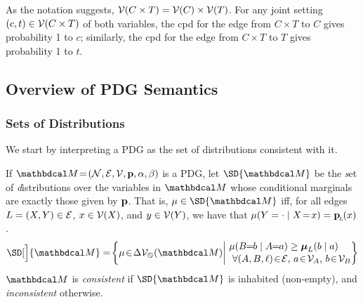 \documentclass{article}
\begin{document}
\begin{constr}
As the notation suggests, $\mathcal V( C \times T) = \mathcal V(C) \times \mathcal V(T)$.
For any joint setting $(c,t) \in \mathcal V(C \times T)$ of both variables, the cpd for
the edge from $C \times T$ to $C$ gives probability 1 to $c$;
similarly, the cpd for the edge from $ C \times T$ to $T$ gives probability 1 to $t$.
\end{constr}


	\subsection{Overview of PDG Semantics}
	\subsubsection{Sets of Distributions}
	We start by interpreting a PDG as the set of distributions consistent with it.  
	\begin{defn} \label{def:set-semantics} 
		If $\dg M\!=\!\pdgvars[]$ is a PDG, let $\SD{\dg M}$ be the \emph{s}et of \emph{d}istributions over the variables in $\dg M$ whose conditional marginals are exactly those given by $\mathbf p$.
		That is, $\mu \in \SD{\dg M}$ iff, for all edges $L = (X,Y) \in \mathcal E$,  $x \in \mathcal V(X)$,  and $y \in \mathcal V(Y)$, we have that $\mu(Y = \cdot \mid X\!=\! x) = \mathbf{p}_{\!_L\!}(x)$.
		{
			\[ \SD[\Big]{\dg M} = \!\left\{\mu \!\in\! \Delta \V_\none (\dg M) \middle|\!
			\begin{array}{l}
				\mu(B\!\! =\!\!b \mid A\!\!=\!\!a) \geq \boldsymbol\mu_L(b \mid a) \\[0.1em]
				~\text{$\forall (A, B,\ell) \!\in\! \Ed$, $a \!\in\!\mathcal V_A$, $b \!\in\! \mathcal V_B$} \end{array}\!\!\! \right\}\]
		}
		$\dg M$ is \emph{consistent} if $\SD{\dg M}$ is inhabited (non-empty), and \emph{inconsistent} otherwise.
	\end{defn}
	
\end{document}
